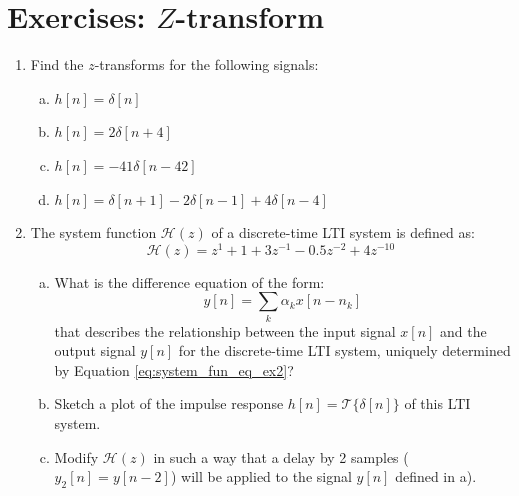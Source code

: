 \newpage
\section{Exercises: $Z$-transform}
\begin{enumerate}

\item Find the $z$-transforms for the following signals:
  \begin{enumerate}[a)]
  \item $h[n] = \delta[n]$
  \item $h[n] = 2\delta[n+4]$
  \item $h[n] = -41\delta[n-42]$
  \item $h[n] = \delta[n+1] - 2\delta[n-1] + 4 \delta[n-4]$
  \end{enumerate}

\item The system function $\mathcal{H}(z)$ of a discrete-time LTI system is defined as:
  \begin{equation}
    \mathcal{H}(z) = z^1 + 1 + 3z^{-1} - 0.5 z^{-2} + 4z^{-10}
    \label{eq:system_fun_eq_ex2}
  \end{equation}
  \begin{enumerate}[a)]
  \item What is the difference equation of the form:
    \begin{equation}
      y[n] = \sum_{k} \alpha_k x[n-n_k]
    \end{equation}
    that describes the relationship between the input signal $x[n]$ and the output signal $y[n]$ for the discrete-time LTI system, uniquely determined by Equation \ref{eq:system_fun_eq_ex2}?
  \item Sketch a plot of the impulse response $h[n]=\mathcal{T}\{\delta[n]\}$ of this LTI system.
  \item Modify $\mathcal{H}(z)$ in such a way that a delay by 2 samples ($y_2[n]=y[n-2]$) will be applied to the signal $y[n]$ defined in a).
  \end{enumerate}

  \begin{marginfigure}

\begin{center}
\end{center}
\end{marginfigure}
\end{enumerate}

